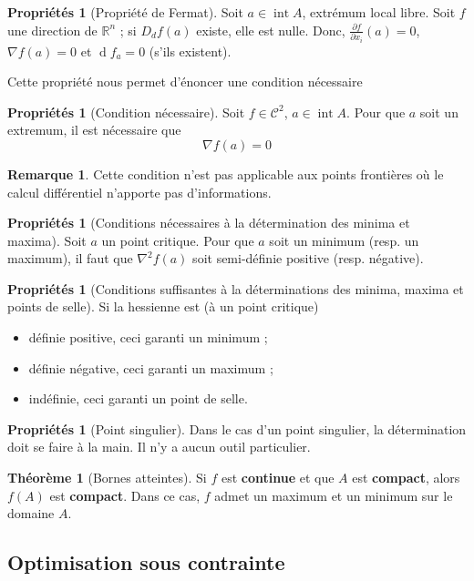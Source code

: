 \documentclass[11pt,a4paper]{article}
\theoremstyle{definition}
\newtheorem{myprop}[mydef]{Propriétés}
\newtheorem{myrem}[mydef]{Remarque}
\newtheorem{mytheo}[mydef]{Théorème}
\DeclareMathOperator{\newint}{int}
\DeclareMathOperator{\diff}{d}
\newcommand{\dif}{\diff\!}
\newcommand{\pa}{\partial}
\newcommand{\R}{\mathbb{R}}
\begin{document}
\begin{myprop}[Propriété de Fermat]
	Soit $a \in \newint A$, extrémum local libre. Soit $f$ une direction de $\R^n$ ; si $D_df(a)$ existe, elle est nulle. Donc, $\frac{\pa f}{\pa x_i}(a) = 0$, $\nabla f(a) = 0$ et $\dif f_a = 0$ (s'ils existent).
\end{myprop}
Cette propriété nous permet d'énoncer une condition nécessaire
\begin{myprop}[Condition nécessaire]
	Soit $f \in \mathcal{C}^2$, $a \in \newint A$. Pour que $a$ soit un extremum, il est nécessaire que
	\[ \nabla f(a) = 0 \]
\end{myprop}

\begin{myrem}
	Cette condition n'est pas applicable aux points frontières où le calcul différentiel n'apporte pas d'informations.
\end{myrem}

\begin{myprop}[Conditions nécessaires à la détermination des minima et maxima]
	Soit $a$ un point critique. Pour que $a$ soit un minimum (resp. un maximum), il faut que $\nabla^2 f(a)$ soit semi-définie positive (resp. négative).
\end{myprop}

\begin{myprop}[Conditions suffisantes à la déterminations des minima, maxima et points de selle]
	Si la hessienne est (à un point critique)
	\begin{itemize}
		\item définie positive, ceci garanti un minimum ;
		\item définie négative, ceci garanti un maximum ;
		\item indéfinie, ceci garanti un point de selle.
	\end{itemize}
\end{myprop}

\begin{myprop}[Point singulier]
	Dans le cas d'un point singulier, la détermination doit se faire à la main. Il n'y a aucun outil particulier.
\end{myprop}

\begin{mytheo}[Bornes atteintes]
	Si $f$ est \textbf{continue} et que $A$ est \textbf{compact}, alors $f(A)$ est \textbf{compact}. Dans ce cas, $f$ admet un maximum et un minimum sur le domaine $A$.
\end{mytheo}

\subsection{Optimisation sous contrainte}
\end{document}
